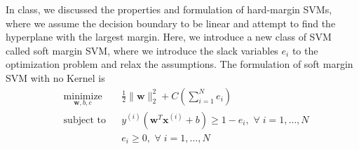\documentclass[12pt]{article}
\begin{document}
 In class, we discussed the properties and formulation of hard-margin SVMs, where we assume the decision boundary to be linear and attempt to find the hyperplane with the largest margin. Here, we introduce a new class of SVM called soft margin SVM, where we introduce the slack variables $e_i$ to the optimization problem and relax the assumptions. The formulation of soft margin SVM with no Kernel is
    \begin{equation*}
    \begin{aligned}
    & \underset{\mathbf{w}, b, e}{\text{minimize}}
    & & \frac{1}{2}\|\mathbf{w}\|_2^2 + C\left(\sum_{i = 1}^N e_i\right)\\
    & \text{subject to}
    & & y^{(i)}(\mathbf{w}^T\mathbf{x}^{(i)} + b) \geq 1 - e_i, \, \, \forall \; i = 1, \dots, N\\
    & & & e_i \geq 0, \, \, \forall \; i = 1, \dots, N
    \end{aligned}
    \end{equation*}
\end{document}

